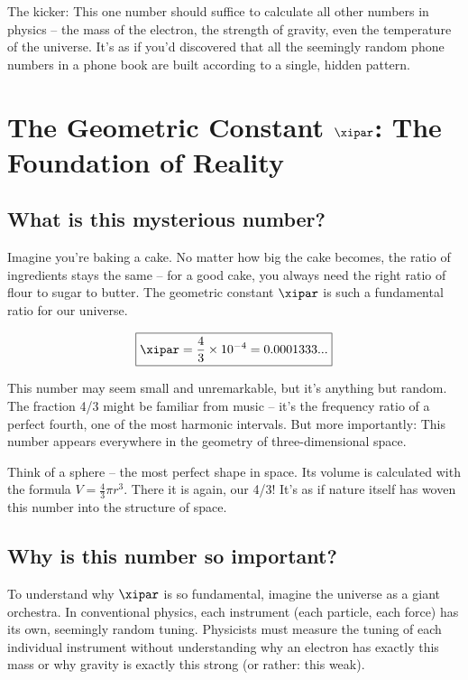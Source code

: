 	The kicker: This one number should suffice to calculate all other numbers in physics -- the mass of the electron, the strength of gravity, even the temperature of the universe. It's as if you'd discovered that all the seemingly random phone numbers in a phone book are built according to a single, hidden pattern.
	
	\section{The Geometric Constant $\xipar$: The Foundation of Reality}
	
	\subsection{What is this mysterious number?}
	
	Imagine you're baking a cake. No matter how big the cake becomes, the ratio of ingredients stays the same -- for a good cake, you always need the right ratio of flour to sugar to butter. The geometric constant $\xipar$ is such a fundamental ratio for our universe.
	
	\begin{equation}
		\boxed{\xipar = \frac{4}{3} \times 10^{-4} = 0.0001333...}
	\end{equation}
	
	This number may seem small and unremarkable, but it's anything but random. The fraction 4/3 might be familiar from music -- it's the frequency ratio of a perfect fourth, one of the most harmonic intervals. But more importantly: This number appears everywhere in the geometry of three-dimensional space.
	
	Think of a sphere -- the most perfect shape in space. Its volume is calculated with the formula $V = \frac{4}{3}\pi r^3$. There it is again, our 4/3! It's as if nature itself has woven this number into the structure of space.
	
	\subsection{Why is this number so important?}
	
	To understand why $\xipar$ is so fundamental, imagine the universe as a giant orchestra. In conventional physics, each instrument (each particle, each force) has its own, seemingly random tuning. Physicists must measure the tuning of each individual instrument without understanding why an electron has exactly this mass or why gravity is exactly this strong (or rather: this weak).
	
